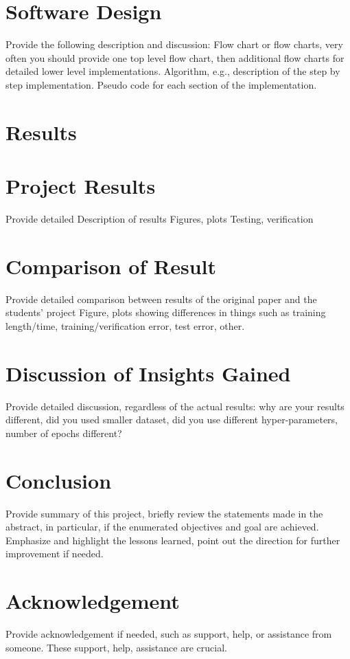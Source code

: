 \documentclass{article}
\begin{document}
\begin{multicols}{2}
\section{Software Design}
 Provide the following description and discussion: 
Flow chart or flow charts, very often you should provide one top level flow chart, then additional flow charts for detailed lower level implementations.  
Algorithm, e.g., description of the step by step implementation.  
Pseudo code for each section of the implementation. 


\section{Results}

\section{Project Results}
Provide detailed 
Description of results
Figures, plots
Testing, verification


\section{Comparison of Result}
 Provide detailed comparison between results of the original paper and the students’ project
Figure, plots  showing differences in things such as training length/time, training/verification error, test error, other.


\section{Discussion of Insights Gained}
Provide detailed discussion, regardless of the actual results: why are your results different, did you used smaller dataset, did you use different hyper-parameters, number of epochs different?


\section{Conclusion}
Provide summary of this project, briefly review the statements made in the abstract, in particular, if the enumerated objectives and goal are achieved. Emphasize and highlight the lessons learned, point out the direction for further improvement if needed. 

\section{Acknowledgement}
Provide acknowledgement if needed, such as support, help, or assistance from someone. These support, help, assistance are crucial.


\end{multicols}
\end{document}
